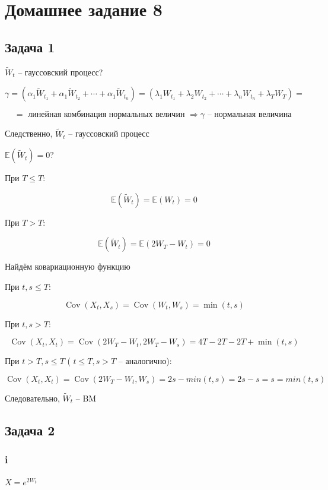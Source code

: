 \documentclass[a4paper,12pt]{article}
\def \mbb{\mathbb}
\def \cov{{\operatorname{Cov}}}
\def \E{\mbb{E}}
\begin{document}
\section{Домашнее задание 8}


\subsection{Задача 1}

$ \tilde{W}_t $ -- гауссовский процесс?

\[ \gamma = \left( \alpha_1  \tilde{W}_{t_{1}} + \alpha_1 \tilde{W}_{t_{2}} + \cdots + \alpha_1 \tilde{W}_{t_{n}} \right)  = \left(\lambda_1 W_{t_{1}} + \lambda_2 W_{t_{2}} + \cdots + \lambda_n W_{t_{n}} + \lambda_T W_{T}  \right) =   \]

\[ = \text{ линейная комбинация нормальных величин } \Rightarrow  \gamma \text{ -- нормальная величина }\] 

Следственно, $ \tilde{W}_t $ -- гауссовский процесс

$ \E(\tilde{W}_t) = 0? $

При $ T \le T $:

\[ \E(\tilde{W}_t) = \E(W_t) = 0 \]

При $ T > T $:

\[ \E(\tilde{W}_t) = \E(2W_T - W_t) = 0 \]

Найдём ковариационную функцию

При $ t,s  \le T $:

\[ \cov(X_t, X_s) = \cov(W_t, W_s) = \min(t,s) \]

При  $ t,s > T $:

\[ \cov(X_t, X_t) = \cov(2W_T - W_t, 2W_T - W_s) = 4T - 2T - 2T + \min(t,s) \]

При  $ t > T, s \le T $ ( $ t \le T, s > T $ -- аналогично):

\[ \cov(X_t, X_t) = \cov(2W_T - W_t, W_s) =  2s - min(t,s) = 2s-s = s = min(t,s)\]

Следовательно, $ \tilde{W}_t $ -- BM

\subsection{Задача 2}

\subsubsection{i}

$ X = e^{2W_t} $
\end{document}
